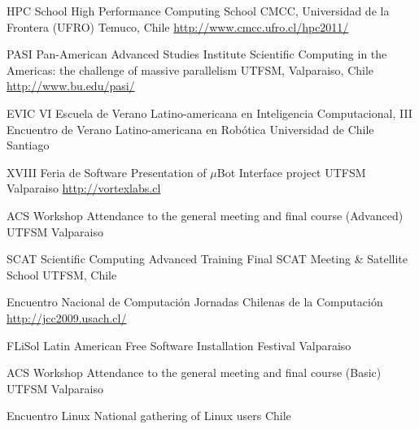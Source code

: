 \documentclass[11pt,a4paper]{moderncv}
\begin{document}
        {HPC School}
        {High Performance Computing School}
        {CMCC, Universidad de la Frontera (UFRO)}
        {Temuco, Chile}
        {\url{http://www.cmcc.ufro.cl/hpc2011/}}

        {PASI}
        {Pan-American Advanced Studies Institute}
        {Scientific Computing in the Americas: the challenge of massive parallelism}
        {UTFSM, Valparaiso, Chile}
        {\url{http://www.bu.edu/pasi/}}

        {EVIC}
        {VI Escuela de Verano Latino-americana en Inteligencia Computacional, %
        III Encuentro de Verano Latino-americana en Robótica}
        {Universidad de Chile}
        {Santiago}
        {}

        {XVIII Feria de Software}
        {Presentation of $\mu$Bot Interface project}
        {UTFSM}
        {Valparaiso}
        {\url{http://vortexlabs.cl}}

        {ACS Workshop}
        {Attendance to the general meeting and final course (Advanced)}
        {UTFSM}
        {Valparaiso}
        {}

        {SCAT}
        {Scientific Computing Advanced Training}
        {Final SCAT Meeting \& Satellite School}
        {UTFSM, Chile}
        {}

        {Encuentro Nacional de Computación}
        {Jornadas Chilenas de la Computación}
        {}
        {}
        {\url{http://jcc2009.usach.cl/}}

        {FLiSol}
        {Latin American Free Software Installation Festival}
        {Valparaiso}
        {}
        {}

        {ACS Workshop}
        {Attendance to the general meeting and final course (Basic)}
        {UTFSM}
        {Valparaiso}
        {}

        {Encuentro Linux}
        {National gathering of Linux users}
        {Chile}
        {}
        {}

\end{document}
